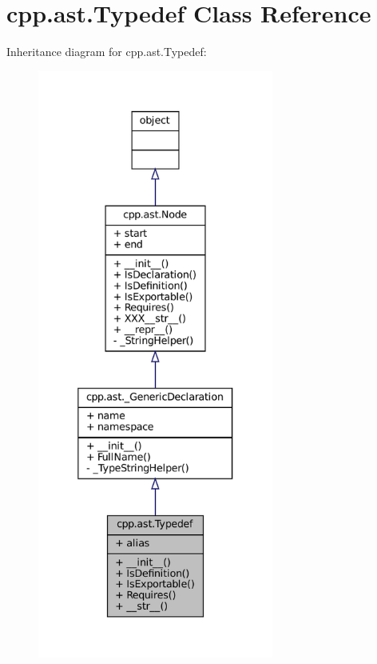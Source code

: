 \hypertarget{classcpp_1_1ast_1_1Typedef}{}\section{cpp.\+ast.\+Typedef Class Reference}
\label{classcpp_1_1ast_1_1Typedef}


Inheritance diagram for cpp.\+ast.\+Typedef\+:
\nopagebreak
\begin{figure}[H]
\begin{center}
\leavevmode
\includegraphics[height=550pt]{classcpp_1_1ast_1_1Typedef__inherit__graph}
\end{center}
\end{figure}


